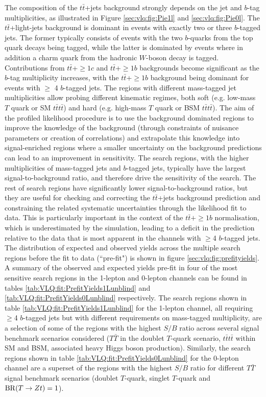 The composition of the $t\bar{t}$+jets background strongly depends on the jet and $b$-tag multiplicities, as illustrated in Figure \ref{sec:vlq:fig:Pie1l} and \ref{sec:vlq:fig:Pie0l}. The $t\bar{t}$+light-jets background is dominant in events with exactly two or three $b$-tagged jets. The former typically consists of events with the two $b$-quarks from the top quark decays being tagged, while the latter is dominated by events where in addition a charm quark from the hadronic $W$-boson decay is tagged. Contributions from $t\bar{t}$+$\ge$$1c$ and $t\bar{t}$+$\ge$$1b$ backgrounds become significant as the $b$-tag multiplicity increases, with the $t\bar{t}$+$\ge$$1b$ background being dominant for events with $\ge$ 4 $b$-tagged jets. The regions with different mass-tagged jet multiplicities allow probing different kinematic regimes, both soft (e.g. low-mass $T$ quark or SM $t\bar{t}t\bar{t}$) and hard (e.g. high-mass $T$ quark or BSM $t\bar{t}t\bar{t}$).
The aim of the profiled likelihood procedure is to use the background dominated regions to improve the knowledge of the background (through constraints of nuisance parameters or creation of correlations) and extrapolate this knowledge into signal-enriched regions where a smaller uncertainty on the background predictions can lead to an improvement in sensitivity.
The search regions, with the higher multiplicities of mass-tagged jets and $b$-tagged jets, typically have the largest signal-to-background ratio, and therefore drive the sensitivity of the search. The rest of search regions have significantly lower signal-to-background ratios, but they are useful for checking and correcting the $t\bar{t}$+jets background prediction and constraining the related systematic uncertainties through the likelihood fit to data.
This is particularly important in the context of the $t\bar{t}+\ge1b$ normalisation, which is underestimated by the simulation, leading to a deficit in the prediction relative to the data that is most apparent in the channels with $\ge$4 $b$-tagged jets.
The distribution of expected and observed yields across the multiple search regions before the fit to data (``pre-fit") is shown in figure \ref{sec:vlq:fig:prefityields}.
A summary of the observed and expected yields pre-fit in four of the most sensitive search regions in the 1-lepton and 0-lepton channels can be found in tables \ref{tab:VLQ:fit:PrefitYields1Lunblind} and \ref{tab:VLQ:fit:PrefitYields0Lunblind} respectively. The search regions shown in table \ref{tab:VLQ:fit:PrefitYields1Lunblind} for the 1-lepton channel, all requiring $\ge$4 $b$-tagged jets but with different requirements on mass-tagged multiplicity, are a selection of some of the regions with the highest $S/B$ ratio across several signal benchmark scenarios considered ($T\bar{T}$ in the doublet $T$-quark scenario, $t\bar{t}t\bar{t}$  within SM and BSM, associated heavy Higgs boson production). Similarly, the search regions shown in table \ref{tab:VLQ:fit:PrefitYields0Lunblind} for the 0-lepton channel are a superset of the regions with the highest $S/B$ ratio for different $T\bar{T}$ signal benchmark scenarios (doublet $T$-quark, singlet $T$-quark and ${\rm BR}(T\to Zt) = 1$).
$$
